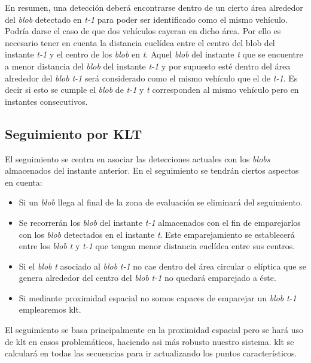 En resumen, una detección deberá encontrarse dentro de un cierto área alrededor del \textit{blob} detectado en \textit{t-1} para poder ser identificado como el mismo vehículo. Podría darse el caso de que dos vehículos cayeran en dicho área. Por ello es necesario tener en cuenta la distancia euclídea entre el centro del blob del instante \textit{t-1} y el centro de los \textit{blob} en \textit{t}. Aquel \textit{blob} del instante \textit{t} que se encuentre a menor distancia del \textit{blob} del instante \textit{t-1} y por supuesto esté dentro del área alrededor del \textit{blob} \textit{t-1} será considerado como el mismo vehículo que el de \textit{
t-1}. Es decir si esto se cumple el \textit{blob} de \textit{t-1} y \textit{t} corresponden al  mismo vehículo pero en instantes consecutivos.

\subsection{Seguimiento por KLT}

El seguimiento se centra en asociar las detecciones actuales con los \textit{blobs} almacenados del instante anterior. En el seguimiento se tendrán ciertos aspectos en cuenta:

\begin{itemize}
    \item Si un \textit{blob} llega al final de la zona de evaluación se eliminará del seguimiento.
    \item Se recorrerán los \textit{blob} del instante \textit{t-1} almacenados con el fin de emparejarlos con los \textit{blob} detectados en el instante \textit{t}. Este emparejamiento se establecerá entre los \textit{blob} \textit{t} y \textit{t-1} que tengan menor distancia euclídea entre sus centros.
    \item Si el \textit{blob} \textit{t} asociado al \textit{blob} \textit{t-1} no cae dentro del área circular o elíptica que se genera alrededor del centro del  \textit{blob} \textit{t-1} no quedará emparejado a éste. 
    \item Si mediante proximidad espacial no somos capaces de emparejar un \textit{blob} \textit{t-1} emplearemos \acrshort{klt}.
\end{itemize}

El seguimiento se basa principalmente en la proximidad espacial pero se hará uso de \acrshort{klt} en casos problemáticos, haciendo asi más robusto nuestro sistema. \acrshort{klt} se calculará en todas las secuencias para ir actualizando los puntos característicos.

